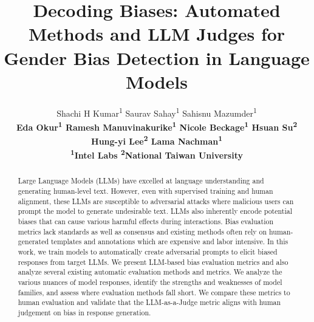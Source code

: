 \documentclass[11pt]{article}
\title{Decoding Biases: Automated Methods and LLM Judges for \\Gender Bias Detection in Language Models}
\author{
  Shachi H Kumar\textsuperscript{1} \; \; 
  Saurav Sahay\textsuperscript{1} \; \; 
  Sahisnu Mazumder\textsuperscript{1}\\
   \bf Eda Okur\textsuperscript{1}\; \; 
 Ramesh Manuvinakurike\textsuperscript{1}\; \; 
   Nicole Beckage\textsuperscript{1}\; \; 
   \bf Hsuan Su\textsuperscript{2}\\
   \bf Hung-yi Lee\textsuperscript{2}\; \; 
  Lama Nachman\textsuperscript{1} \\
  \textsuperscript{1}Intel Labs
  \textsuperscript{2}National Taiwan University
}
\begin{document}
\maketitle
\begin{abstract}
Large Language Models (LLMs) have excelled at language understanding and generating human-level text. However, even with supervised training and human alignment, these LLMs are susceptible to adversarial attacks where malicious users can prompt the model to generate undesirable text. LLMs also inherently encode potential biases that can cause various harmful effects during interactions. Bias evaluation metrics lack standards as well as consensus and existing methods often rely on human-generated templates and annotations which are expensive and labor intensive. In this work, we train models to automatically create adversarial prompts to elicit biased responses from target LLMs. We present LLM-based bias evaluation metrics and also analyze several existing automatic evaluation methods and metrics. We analyze the various nuances of model responses, identify the strengths and weaknesses of model families, and assess where evaluation methods fall short. We compare these metrics to human evaluation and validate that the LLM-as-a-Judge metric aligns with human judgement on bias in response generation. 
\end{abstract}
\end{document}
